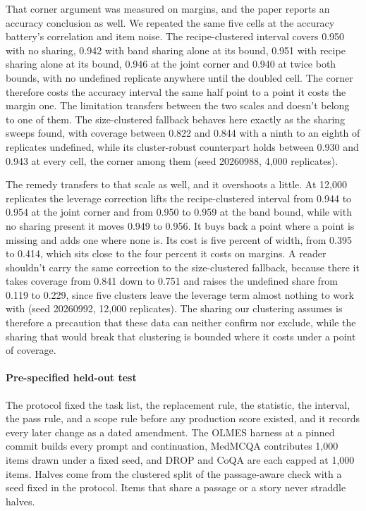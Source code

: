 That corner argument was measured on margins, and the paper reports an accuracy conclusion as well. We repeated the same five cells at the accuracy battery's correlation and item noise. The recipe-clustered interval covers 0.950 with no sharing, 0.942 with band sharing alone at its bound, 0.951 with recipe sharing alone at its bound, 0.946 at the joint corner and 0.940 at twice both bounds, with no undefined replicate anywhere until the doubled cell. The corner therefore costs the accuracy interval the same half point to a point it costs the margin one. The limitation transfers between the two scales and doesn't belong to one of them. The size-clustered fallback behaves here exactly as the sharing sweeps found, with coverage between 0.822 and 0.844 with a ninth to an eighth of replicates undefined, while its cluster-robust counterpart holds between 0.930 and 0.943 at every cell, the corner among them (seed 20260988, 4,000 replicates).

The remedy transfers to that scale as well, and it overshoots a little. At 12,000 replicates the leverage correction lifts the recipe-clustered interval from 0.944 to 0.954 at the joint corner and from 0.950 to 0.959 at the band bound, while with no sharing present it moves 0.949 to 0.956. It buys back a point where a point is missing and adds one where none is. Its cost is five percent of width, from 0.395 to 0.414, which sits close to the four percent it costs on margins. A reader shouldn't carry the same correction to the size-clustered fallback, because there it takes coverage from 0.841 down to 0.751 and raises the undefined share from 0.119 to 0.229, since five clusters leave the leverage term almost nothing to work with (seed 20260992, 12,000 replicates). The sharing our clustering assumes is therefore a precaution that these data can neither confirm nor exclude, while the sharing that would break that clustering is bounded where it costs under a point of coverage.


\paragraph{Pre-specified held-out test}\label{app:heldout}
The protocol fixed the task list, the replacement rule, the statistic, the interval, the pass rule, and a scope rule before any production score existed, and it records every later change as a dated amendment. The OLMES harness at a pinned commit builds every prompt and continuation, MedMCQA contributes 1,000 items drawn under a fixed seed, and DROP and CoQA are each capped at 1,000 items. Halves come from the clustered split of the passage-aware check with a seed fixed in the protocol. Items that share a passage or a story never straddle halves.

